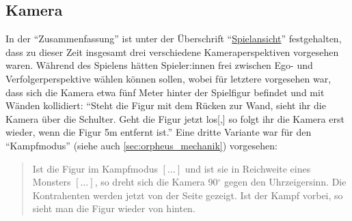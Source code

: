\documentclass[a5paper,pagesize,numbers=noenddot]{scrbook}
\begin{document}
\subsection{Kamera}\label{sec:orpheus_darstellung_kamera}
In der \enquote{Zusammenfassung} ist unter der Überschrift \enquote{\uline{Spielansicht}} festgehalten, dass zu dieser Zeit insgesamt drei verschiedene Kameraperspektiven vorgesehen waren.
Während des Spielens hätten Spieler:innen frei zwischen Ego- und Verfolgerperspektive wählen können sollen, wobei für letztere vorgesehen war, dass sich die Kamera etwa fünf Meter hinter der Spielfigur befindet und mit Wänden kollidiert:
\enquote{Steht die Figur mit dem Rücken zur Wand, sieht ihr die Kamera über die Schulter. Geht die Figur jetzt los[,] so folgt ihr die Kamera erst wieder, wenn die Figur 5m entfernt ist.}
Eine dritte Variante war für den \enquote{Kampfmodus} (siehe auch \autoref{sec:orpheus_mechanik}) vorgesehen:

\begin{quote}
Ist die Figur im Kampfmodus $[\dots]$ und ist sie in Reichweite eines Monsters $[\dots]$, so dreht sich die Kamera 90$^\circ$ gegen den Uhrzeigersinn. Die Kontrahenten werden jetzt von der Seite gezeigt.
Ist der Kampf vorbei, so sieht man die Figur wieder von hinten.
\end{quote}


\end{document}
